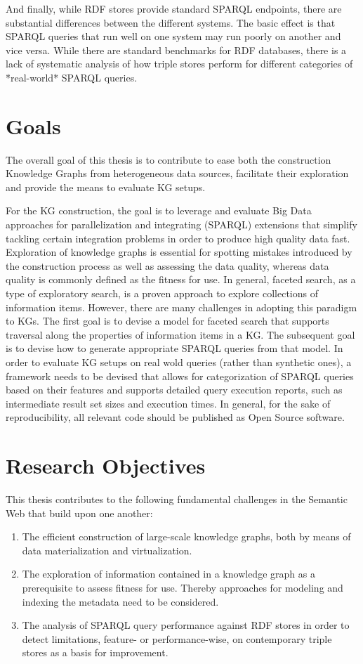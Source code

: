 And finally, while RDF stores provide standard SPARQL endpoints, there are substantial differences between the different systems.
The basic effect is that SPARQL queries that run well on one system may run poorly on another and vice versa. While there are standard benchmarks for RDF databases, there is a lack of systematic analysis of how triple stores perform for different categories of *real-world* SPARQL queries.

\section{Goals}

The overall goal of this thesis is to contribute to ease both the construction Knowledge Graphs from heterogeneous data sources, facilitate their exploration and provide the means to evaluate KG setups.

For the KG construction, the goal is to leverage and evaluate Big Data approaches for parallelization and integrating (SPARQL) extensions that simplify tackling certain integration problems in order to produce high quality data fast.
Exploration of knowledge graphs is essential for spotting mistakes introduced by the construction process as well as assessing the data quality, whereas data quality is commonly defined as the fitness for use.
In general, faceted search, as a type of exploratory search, is a proven approach to explore collections of information items.
However, there are many challenges in adopting this paradigm to KGs.
The first goal is to devise a model for faceted search that supports traversal along the properties of information items in a KG.
The subsequent goal is to devise how to generate appropriate SPARQL queries from that model.
In order to evaluate KG setups on real wold queries (rather than synthetic ones), a framework needs to be devised that allows for categorization of SPARQL queries based on their features and supports detailed query execution reports, such as intermediate result set sizes and execution times.
In general, for the sake of reproducibility, all relevant code should be published as Open Source software.

\section{Research Objectives}

This thesis contributes to the following fundamental challenges in the Semantic Web that build upon one another:
\begin{enumerate}
\item The efficient construction of large-scale knowledge graphs, both by means of data materialization and virtualization.
\item The exploration of information contained in a knowledge graph as a prerequisite to assess fitness for use.
Thereby approaches for modeling and indexing the metadata need to be considered.
\item The analysis of SPARQL query performance against RDF stores in order to detect limitations, feature- or performance-wise, on contemporary triple stores as a basis for improvement.
\end{enumerate}

